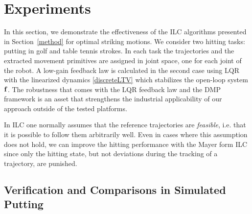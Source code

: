 \section{Experiments}\label{experiments}


In this section, we demonstrate the effectiveness of the ILC algorithms presented in Section~\ref{method} for optimal striking motions. We consider two hitting tasks: putting in golf and table tennis strokes. In each task the trajectories and the extracted movement primitives are assigned in joint space, one for each joint of the robot. A low-gain feedback law is calculated in the second case using LQR with the linearized dynamics \eqref{discreteLTV} which stabilizes the open-loop system $\boldsymbol{\mathrm{f}}$. The robustness that comes with the LQR feedback law and the DMP framework is an asset that strengthens the industrial applicability of our approach outside of the tested platforms.

In ILC one normally assumes that the reference trajectories are \emph{feasible}, i.e. that it is possible to follow them arbitrarily well. Even in cases where this assumption does not hold, we can improve the hitting performance with the Mayer form ILC since only the hitting state, but not deviations during the tracking of a trajectory, are  punished.

\subsection{Verification and Comparisons in Simulated Putting}


